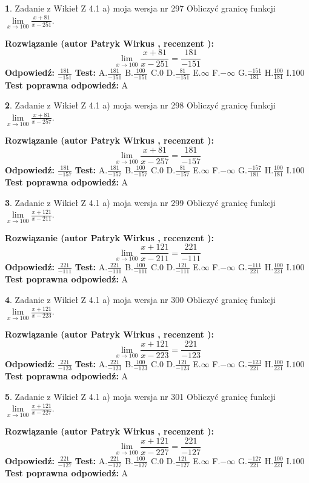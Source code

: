 \documentclass[12pt, a4paper]{article}
\theoremstyle{definition} %
\newtheorem{zad}{}
\newcommand{\zadStart}[1]{\begin{zad}#1\newline}
\newcommand{\zadStop}{\end{zad}}
\newcommand{\rozwStart}[2]{\noindent \textbf{Rozwiązanie (autor #1 , recenzent #2): }\newline}
\newcommand{\rozwStop}{\newline}
\newcommand{\odpStart}{\noindent \textbf{Odpowiedź:}\newline}
\newcommand{\odpStop}{\newline}
\newcommand{\testStart}{\noindent \textbf{Test:}\newline}
\newcommand{\testStop}{\newline}
\newcommand{\kluczStart}{\noindent \textbf{Test poprawna odpowiedź:}\newline}
\newcommand{\kluczStop}{\newline}
\begin{document}
\zadStart{Zadanie z Wikieł Z 4.1 a) moja wersja nr 297}
Obliczyć granicę funkcji $\lim\limits_{x\to100}\frac{x+81}{x-251}$.
\zadStop
\rozwStart{Patryk Wirkus}{}
$$\lim\limits_{x\to100}\frac{x+81}{x-251} = \frac{181}{-151}$$
\rozwStop
\odpStart
$\frac{181}{-151}$
\odpStop
\testStart
A.$\frac{181}{-151}$
B.$\frac{100}{-151}$
C.$0$
D.$\frac{81}{-151}$
E.$\infty$
F.$-\infty$
G.$\frac{-151}{181}$
H.$\frac{100}{181}$
I.$100$
\testStop
\kluczStart
A
\kluczStop



\zadStart{Zadanie z Wikieł Z 4.1 a) moja wersja nr 298}
Obliczyć granicę funkcji $\lim\limits_{x\to100}\frac{x+81}{x-257}$.
\zadStop
\rozwStart{Patryk Wirkus}{}
$$\lim\limits_{x\to100}\frac{x+81}{x-257} = \frac{181}{-157}$$
\rozwStop
\odpStart
$\frac{181}{-157}$
\odpStop
\testStart
A.$\frac{181}{-157}$
B.$\frac{100}{-157}$
C.$0$
D.$\frac{81}{-157}$
E.$\infty$
F.$-\infty$
G.$\frac{-157}{181}$
H.$\frac{100}{181}$
I.$100$
\testStop
\kluczStart
A
\kluczStop



\zadStart{Zadanie z Wikieł Z 4.1 a) moja wersja nr 299}
Obliczyć granicę funkcji $\lim\limits_{x\to100}\frac{x+121}{x-211}$.
\zadStop
\rozwStart{Patryk Wirkus}{}
$$\lim\limits_{x\to100}\frac{x+121}{x-211} = \frac{221}{-111}$$
\rozwStop
\odpStart
$\frac{221}{-111}$
\odpStop
\testStart
A.$\frac{221}{-111}$
B.$\frac{100}{-111}$
C.$0$
D.$\frac{121}{-111}$
E.$\infty$
F.$-\infty$
G.$\frac{-111}{221}$
H.$\frac{100}{221}$
I.$100$
\testStop
\kluczStart
A
\kluczStop



\zadStart{Zadanie z Wikieł Z 4.1 a) moja wersja nr 300}
Obliczyć granicę funkcji $\lim\limits_{x\to100}\frac{x+121}{x-223}$.
\zadStop
\rozwStart{Patryk Wirkus}{}
$$\lim\limits_{x\to100}\frac{x+121}{x-223} = \frac{221}{-123}$$
\rozwStop
\odpStart
$\frac{221}{-123}$
\odpStop
\testStart
A.$\frac{221}{-123}$
B.$\frac{100}{-123}$
C.$0$
D.$\frac{121}{-123}$
E.$\infty$
F.$-\infty$
G.$\frac{-123}{221}$
H.$\frac{100}{221}$
I.$100$
\testStop
\kluczStart
A
\kluczStop



\zadStart{Zadanie z Wikieł Z 4.1 a) moja wersja nr 301}
Obliczyć granicę funkcji $\lim\limits_{x\to100}\frac{x+121}{x-227}$.
\zadStop
\rozwStart{Patryk Wirkus}{}
$$\lim\limits_{x\to100}\frac{x+121}{x-227} = \frac{221}{-127}$$
\rozwStop
\odpStart
$\frac{221}{-127}$
\odpStop
\testStart
A.$\frac{221}{-127}$
B.$\frac{100}{-127}$
C.$0$
D.$\frac{121}{-127}$
E.$\infty$
F.$-\infty$
G.$\frac{-127}{221}$
H.$\frac{100}{221}$
I.$100$
\testStop
\kluczStart
A
\kluczStop
\end{document}
